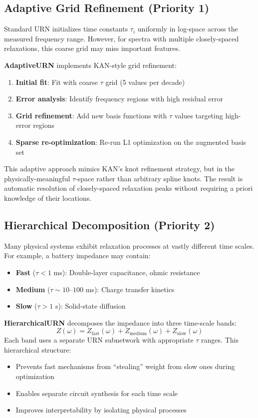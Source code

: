 \documentclass{ieeeaccess}
\begin{document}
\subsection{Adaptive Grid Refinement (Priority 1)}
\label{sec:adaptive}

Standard URN initializes time constants $\tau_i$ uniformly in log-space across the measured frequency range. However, for spectra with multiple closely-spaced relaxations, this coarse grid may miss important features.

\textbf{AdaptiveURN} implements KAN-style grid refinement:
\begin{enumerate}
\item \textbf{Initial fit}: Fit with coarse $\tau$ grid (5 values per decade)
\item \textbf{Error analysis}: Identify frequency regions with high residual error
\item \textbf{Grid refinement}: Add new basis functions with $\tau$ values targeting high-error regions
\item \textbf{Sparse re-optimization}: Re-run L1 optimization on the augmented basis set
\end{enumerate}

This adaptive approach mimics KAN's knot refinement strategy, but in the physically-meaningful $\tau$-space rather than arbitrary spline knots. The result is automatic resolution of closely-spaced relaxation peaks without requiring a priori knowledge of their locations.

\subsection{Hierarchical Decomposition (Priority 2)}
\label{sec:hierarchical}

Many physical systems exhibit relaxation processes at vastly different time scales. For example, a battery impedance may contain:
\begin{itemize}
\item \textbf{Fast} ($\tau < 1$ ms): Double-layer capacitance, ohmic resistance
\item \textbf{Medium} ($\tau \sim 10$--$100$ ms): Charge transfer kinetics
\item \textbf{Slow} ($\tau > 1$ s): Solid-state diffusion
\end{itemize}

\textbf{HierarchicalURN} decomposes the impedance into three time-scale bands:
\begin{equation}
Z(\omega) = Z_{\text{fast}}(\omega) + Z_{\text{medium}}(\omega) + Z_{\text{slow}}(\omega)
\end{equation}
Each band uses a separate URN subnetwork with appropriate $\tau$ ranges. This hierarchical structure:
\begin{itemize}
\item Prevents fast mechanisms from ``stealing'' weight from slow ones during optimization
\item Enables separate circuit synthesis for each time scale
\item Improves interpretability by isolating physical processes
\end{itemize}
\end{document}
